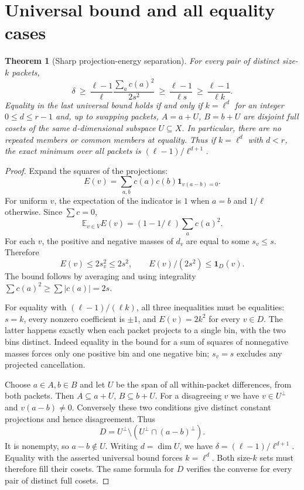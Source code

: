 \documentclass[11pt]{article}
\newtheorem{theorem}{Theorem}[section]
\theoremstyle{remark}\newtheorem{remark}[theorem]{Remark}
\newcommand{\E}{\mathbb E}
\newcommand{\1}{\mathbf 1}
\begin{document}
\section{Universal bound and all equality cases}
\begin{theorem}[Sharp projection-energy separation]\label{thm:energy}
For every pair of distinct size-$k$ packets,
\begin{equation}\label{eq:energybound}
 \delta\ \ge\ \frac{\ell-1}{\ell}\frac{\sum_a c(a)^2}{2s^2}
 \ \ge\ \frac{\ell-1}{\ell s}\ \ge\ \frac{\ell-1}{\ell k}.
\end{equation}
Equality in the last universal bound holds if and only if $k=\ell^d$ for an integer $0\le d\le r-1$ and, up to swapping packets, $A=a+U$, $B=b+U$ are disjoint full cosets of the same $d$-dimensional subspace $U\subseteq X$. In particular, there are no repeated members or common members at equality. Thus if $k=\ell^d$ with $d<r$, the exact minimum over all packets is $(\ell-1)/\ell^{d+1}$.
\end{theorem}
\begin{proof}
Expand the squares of the projections:
\[
 E(v)=\sum_{a,b}c(a)c(b)\1_{v(a-b)=0}.
\]
For uniform $v$, the expectation of the indicator is $1$ when $a=b$ and $1/\ell$ otherwise. Since $\sum c=0$,
\begin{equation}\label{eq:identity}
 \E_{v\in V} E(v)=(1-1/\ell)\sum_a c(a)^2.
\end{equation}
For each $v$, the positive and negative masses of $d_v$ are equal to some $s_v\le s$. Therefore
\[
 E(v)\le 2s_v^2\le2s^2,
 \qquad E(v)/(2s^2)\le\1_D(v).
\]
The bound follows by averaging and using integrality $\sum c(a)^2\ge\sum|c(a)|=2s$.

For equality with $(\ell-1)/(\ell k)$, all three inequalities must be equalities: $s=k$, every nonzero coefficient is $\pm1$, and $E(v)=2k^2$ for every $v\in D$. The latter happens exactly when each packet projects to a single bin, with the two bins distinct. Indeed equality in the bound for a sum of squares of nonnegative masses forces only one positive bin and one negative bin; $s_v=s$ excludes any projected cancellation.

Choose $a\in A,b\in B$ and let $U$ be the span of all within-packet differences, from both packets. Then $A\subseteq a+U$, $B\subseteq b+U$. For a disagreeing $v$ we have $v\in U^\perp$ and $v(a-b)\ne0$. Conversely these two conditions give distinct constant projections and hence disagreement. Thus
\[
 D=U^\perp\setminus(U^\perp\cap(a-b)^\perp).
\]
It is nonempty, so $a-b\notin U$. Writing $d=\dim U$, we have $\delta=(\ell-1)/\ell^{d+1}$. Equality with the asserted universal bound forces $k=\ell^d$. Both size-$k$ sets must therefore fill their cosets. The same formula for $D$ verifies the converse for every pair of distinct full cosets.
\end{proof}
\end{document}
